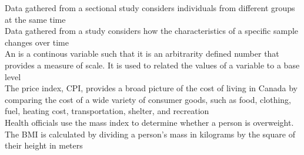 Data gathered from a  sectional study considers individuals from different groups at the same time\\

Data gathered from a  study considers how the characteristics of a specific sample changes over time\\

An  is a continous variable such that it is an arbitrarity defined number that provides a measure of scale. 
It is used to related the values of a variable to a base level\\

The  price index, CPI, provides a broad picture of the cost of living in Canada by comparing the cost of a wide variety
of consumer goods, such as food, clothing, fuel, heating cost, transportation, shelter, and recreation\\

Health officials use the  mass index to determine whether a person is overweight. The BMI is calculated by dividing a person's mass
in kilograms by the square of their height in meters\\

